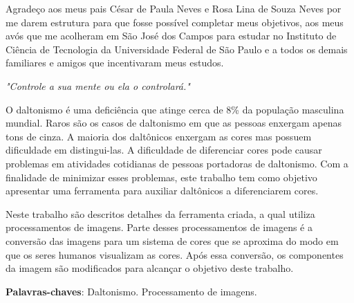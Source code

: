 \documentclass[	12pt, Times, openright, twoside, a4paper, english, brazil]{abntex2}
\begin{document}
\begin{agradecimentos}
Agradeço aos meus pais César de Paula Neves e Rosa Lina de Souza Neves por me darem estrutura para que fosse possível completar meus objetivos, aos meus avós que me acolheram em São José dos Campos para estudar no Instituto de Ciência de Tecnologia da Universidade Federal de São Paulo e a todos os demais familiares e amigos que incentivaram meus estudos.


\end{agradecimentos}

\begin{epigrafe}
    \vspace*{\fill}
	\begin{flushright}
		\textit{"Controle a sua mente ou ela o controlará."}
	\end{flushright}
\end{epigrafe}


\begin{resumo}
O daltonismo é uma deficiência que atinge cerca de 8\% da população masculina mundial. Raros são os casos de daltonismo em que as pessoas enxergam apenas tons de cinza. A maioria dos daltônicos enxergam as cores mas possuem dificuldade em distingui-las. A dificuldade de diferenciar cores pode causar problemas em atividades cotidianas de pessoas portadoras de daltonismo. Com a finalidade de minimizar esses problemas, este trabalho tem como objetivo apresentar uma ferramenta para auxiliar daltônicos a diferenciarem cores.

Neste trabalho são descritos detalhes da ferramenta criada, a qual utiliza processamentos de imagens.  Parte desses processamentos de imagens é a conversão das imagens para um sistema de cores que se aproxima do modo em que os seres humanos visualizam as cores. Após essa conversão, os componentes da imagem são modificados para alcançar o objetivo deste trabalho.

 \vspace{\onelineskip}
    
 \noindent
 \textbf{Palavras-chaves}: Daltonismo. Processamento de imagens. 
\end{resumo}
\end{document}
